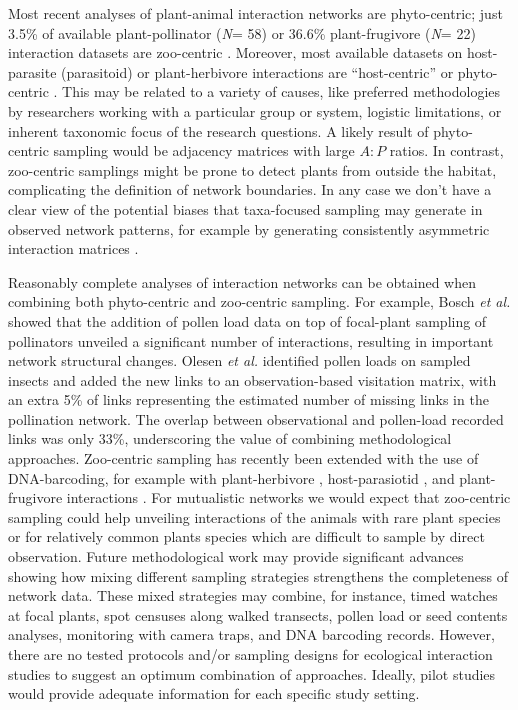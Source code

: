 \documentclass[12pt]{article}
\begin{document}
Most recent analyses of plant-animal interaction networks are phyto-centric; just 3.5\% of available plant-pollinator (\emph{N}= 58) or 36.6\% plant-frugivore (\emph{N}= 22) interaction datasets are zoo-centric \citep[see][]{Schleuning:2012eg}. Moreover, most available datasets on host-parasite (parasitoid) or plant-herbivore interactions are ``host-centric'' or phyto-centric \citep[e.g.,][]{Thebault:2010jv,Morris:2013eh,Eklof:2013ed}. This may be related to a variety of causes, like preferred methodologies by researchers working with a particular group or system, logistic limitations, or inherent taxonomic focus of the research questions. A likely result of phyto-centric sampling would be adjacency matrices with large $A:P$ ratios. In contrast, zoo-centric samplings might be prone to detect plants from outside the habitat, complicating the definition of network boundaries. In any case we don't have a clear view of the potential biases that taxa-focused sampling may generate in observed network patterns, for example by generating consistently asymmetric interaction matrices \citep{Dormann:2009aa}.  

Reasonably complete analyses of interaction networks can be obtained when combining both phyto-centric and zoo-centric sampling. For example, Bosch \emph{et al.} \citeyearpar{Bosch:2009jga} showed that the addition of pollen load data on top of focal-plant sampling of pollinators unveiled a significant number of interactions, resulting in important network structural changes. Olesen \emph{et al.}\citeyearpar[][]{Olesen:2011a} identified pollen loads on sampled insects and added the new links to an observation-based visitation matrix, with an extra 5\% of links representing the estimated number of missing links in the pollination network. The overlap between observational and pollen-load recorded links was only 33\%, underscoring the value of combining methodological approaches. Zoo-centric sampling has recently been extended with the use of DNA-barcoding, for example with plant-herbivore \citep{JuradoRivera:2009cp}, host-parasiotid \citep{Wirta:2014aa}, and plant-frugivore interactions \citep{GonzalezVaro:2014ij}. For mutualistic networks we would expect that zoo-centric sampling could help unveiling interactions of the animals with rare plant species or for relatively common plants species which are difficult to sample by direct observation. Future methodological work may provide significant advances showing how mixing different sampling strategies strengthens the completeness of network data. These mixed strategies may combine, for instance, timed watches at focal plants, spot censuses along walked transects, pollen load or seed contents analyses, monitoring with camera traps, and DNA barcoding records. However, there are no tested protocols and\slash or sampling designs for ecological interaction studies to suggest an optimum combination of approaches. Ideally, pilot studies would provide adequate information for each specific study setting.
\end{document}
